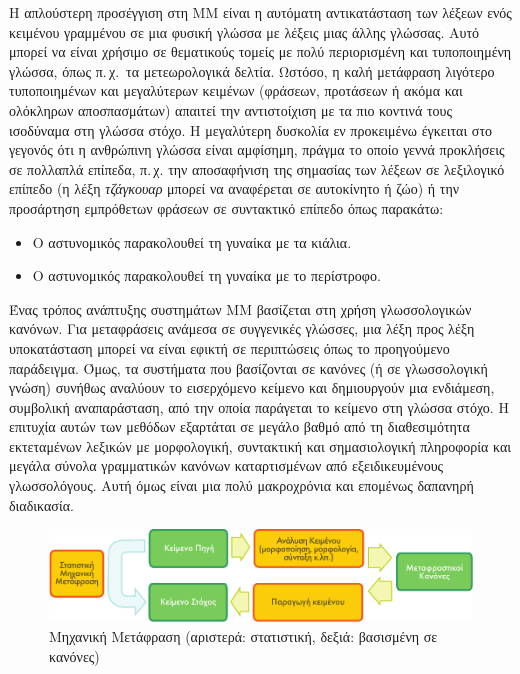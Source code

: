 \begin{multicols}{2}

Η απλούστερη προσέγγιση στη ΜΜ είναι η αυτόματη αντικατάσταση των λέξεων ενός κειμένου γραμμένου σε μια φυσική γλώσσα με λέξεις μιας άλλης γλώσσας. Αυτό μπορεί να είναι χρήσιμο σε θεματικούς τομείς με πολύ περιορισμένη και τυποποιημένη γλώσσα, όπως π.\,χ.~τα μετεωρολογικά δελτία. Ωστόσο, η καλή μετάφραση λιγότερο τυποποιημένων και μεγαλύτερων κειμένων (φράσεων, προτάσεων ή ακόμα και ολόκληρων αποσπασμάτων) απαιτεί την αντιστοίχιση με τα πιο κοντινά τους ισοδύναμα στη γλώσσα στόχο. Η μεγαλύτερη δυσκολία εν προκειμένω έγκειται στο γεγονός ότι η ανθρώπινη γλώσσα είναι αμφίσημη, πράγμα το οποίο γεννά προκλήσεις σε πολλαπλά επίπεδα, π.\,χ. την αποσαφήνιση της σημασίας των λέξεων σε λεξιλογικό επίπεδο (η λέξη \textit{τζάγκουαρ} μπορεί να αναφέρεται σε αυτοκίνητο ή ζώο) ή την προσάρτηση εμπρόθετων φράσεων σε συντακτικό επίπεδο όπως παρακάτω:

\begin{itemize}
\item Ο αστυνομικός παρακολουθεί τη γυναίκα με τα κιάλια.
\item Ο αστυνομικός παρακολουθεί τη γυναίκα με το περίστροφο.
\end{itemize}

Ένας τρόπος ανάπτυξης συστημάτων ΜΜ βασίζεται στη χρήση  γλωσσολογικών κανόνων. Για μεταφράσεις ανάμεσα σε συγγενικές γλώσσες, μια λέξη προς λέξη υποκατάσταση μπορεί να είναι εφικτή σε περιπτώσεις όπως το προηγούμενο παράδειγμα. Όμως, τα συστήματα που βασίζονται σε κανόνες (ή σε γλωσσολογική γνώση) συνήθως αναλύουν το εισερχόμενο κείμενο και δημιουργούν μια ενδιάμεση, συμβολική αναπαράσταση, από την οποία παράγεται το κείμενο στη γλώσσα στόχο. Η επιτυχία αυτών των μεθόδων εξαρτάται σε μεγάλο βαθμό από τη διαθεσιμότητα εκτεταμένων λεξικών με μορφολογική, συντακτική και σημασιολογική πληροφορία και μεγάλα σύνολα γραμματικών κανόνων καταρτισμένων από εξειδικευμένους γλωσσολόγους. Αυτή όμως είναι μια πολύ μακροχρόνια και επομένως δαπανηρή διαδικασία.

\begin{figure}[htb]
  \center
  \includegraphics[width=\textwidth]{../_media/greek/machine_translation}
  \caption{Μηχανική Μετάφραση (αριστερά: στατιστική, δεξιά: βασισμένη σε κανόνες)}
  \label{fig:mtarch_de}
\end{figure}


\end{multicols}

